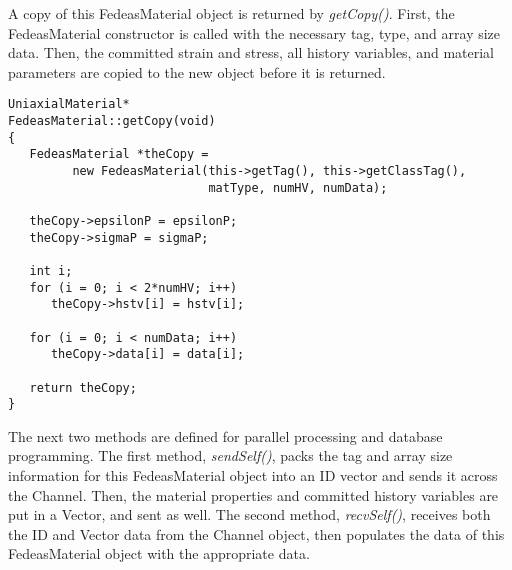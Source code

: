 \documentclass[12pt]{article}
\begin{document}
\noindent A copy of this FedeasMaterial object is returned by {\em getCopy()}. First, the
FedeasMaterial constructor is called with the necessary tag, type, and array size data.
Then, the committed strain and stress, all history variables, and material parameters
are copied to the new object before it is returned.

{\sf\small
\begin{verbatim}
UniaxialMaterial*
FedeasMaterial::getCopy(void)
{
   FedeasMaterial *theCopy = 
         new FedeasMaterial(this->getTag(), this->getClassTag(),
                            matType, numHV, numData);

   theCopy->epsilonP = epsilonP;
   theCopy->sigmaP = sigmaP;

   int i;
   for (i = 0; i < 2*numHV; i++)
      theCopy->hstv[i] = hstv[i];

   for (i = 0; i < numData; i++)
      theCopy->data[i] = data[i];

   return theCopy;
}
\end{verbatim}
}

\noindent The next two methods are defined for parallel processing and database programming.
The first method, {\em sendSelf()}, packs the tag and array size information for this FedeasMaterial
object into an ID vector and sends it across the Channel. Then, the material properties and 
committed history variables are put in a Vector, and sent as well.
The second method, {\em recvSelf()}, receives both the ID and Vector data from the Channel object, 
then populates the data of this FedeasMaterial object with the appropriate data.
\end{document}
